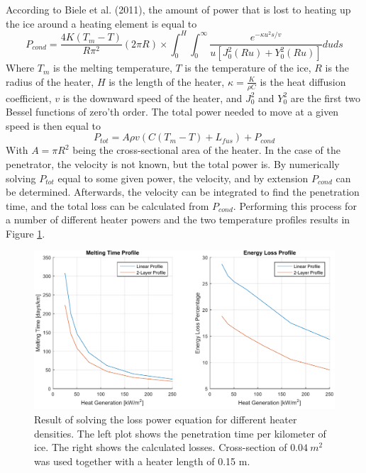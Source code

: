 \noindent
According to Biele et al. (2011)\cite{article:biele2011a}, the amount of power that is lost to heating up the ice around a heating element is equal to
\begin{equation}
P_{cond}=\frac{4 K (T_m-T) }{R\pi^2}(2\pi R)\times \int_{0}^{H}\int_{0}^{\infty}\frac{
e^{-\kappa u^2 s/v}
}{
u\left[J_0^2(R u) + Y_0^2(R u)\right]
}duds
\end{equation}
Where $T_m$ is the melting temperature, $T$ is the temperature of the ice, $R$ is the radius of the heater, $H$ is the length of the heater, $\kappa=\frac{K}{\rho C}$ is the heat diffusion coefficient, $v$ is the downward speed of the heater, and $J_0^2$ and $Y_0^2$ are the first two Bessel functions of zero'th order. The total power needed to move at a given speed is then equal to
\begin{equation}
P_{tot} = A\rho v(C(T_m-T) + L_{fus}) + P_{cond}
\end{equation} 
With $A=\pi R^2$ being the cross-sectional area of the heater. In the case of the penetrator, the velocity is not known, but the total power is. By numerically solving $P_{tot}$ equal to some given power, the velocity, and by extension $P_{cond}$ can be determined. Afterwards, the velocity can be integrated to find the penetration time, and the total loss can be calculated from $P_{cond}$. Performing this process for a number of different heater powers and the two temperature profiles results in Figure \ref{fig:verificationResult}.

\begin{figure}[ht]
	\centering
	\includegraphics[width=.9\textwidth]{figures/LAMC/verificationResult.pdf}
	\caption{Result of solving the loss power equation for different heater densities. The left plot shows the penetration time per kilometer of ice. The right shows the calculated losses. Cross-section of $\SI{0.04}{m^2}$ was used together with a heater length of 0.15 m.}
	\label{fig:verificationResult}
\end{figure}

